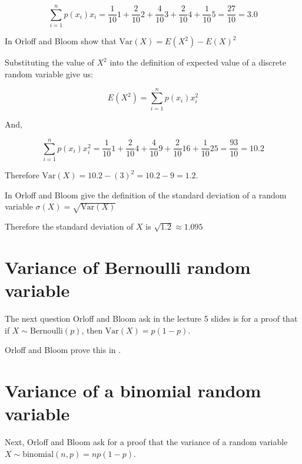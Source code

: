 \documentclass[a4paper,11pt]{article}
\begin{document}
\begin{equation}
      \sum_{i=1}^{n} p\left( x_{i} \right) x_i
  = \frac{1}{10} 1 + \frac{2}{10} 2 + \frac{4}{10} 3 + \frac{2}{10} 4 +
    \frac{1}{10} 5 = \frac{27}{10} = 3.0
\end{equation}

In \cite{reading5a} Orloff and Bloom show that
$\text{Var}\left(X \right) = E \left(X^{2}\right) - E\left( X \right)^{2}$

Substituting the value of $X^{2}$ into the definition of expected value of
a discrete random variable give us:

\begin{equation}
    E\left(X^{2} \right) =
      \sum_{i=1}^{n} p\left( x_{i} \right) x_i^{2}
\end{equation}

And,

\begin{equation}
    \sum_{i=1}^{n} p\left( x_{i} \right) x_i^{2}
    = \frac{1}{10} 1 + \frac{2}{10} 4 + \frac{4}{10} 9 + \frac{2}{10} 16 +
    \frac{1}{10} 25 = \frac{93}{10} = 10.2
\end{equation}

Therefore $\text{Var}\left( X \right) = 10.2 - \left( 3 \right)^{2}
  = 10.2 - 9 = 1.2$.

In \cite{reading5a} Orloff and Bloom give the definition of the standard
deviation of a random variable
$\sigma \left( X \right) = \sqrt{\text{Var}\left(X \right)}$

Therefore the standard deviation of $X$ is $\sqrt{1.2} \approx 1.095 $

\section{Variance of Bernoulli random variable}

The next question Orloff and Bloom ask in the lecture 5 slides is for a proof
that if $X \sim \text{Bernoulli} \left( p \right)$, then
$\text{Var}\left( X \right) = p\left( 1-p \right)$.

Orloff and Bloom prove this in \cite{reading5a}.

\section{Variance of a binomial random variable}

Next, Orloff and Bloom ask for a proof that the variance of a random variable
$X \sim \text{binomial}\left(n, p \right) = np \left( 1 - p \right)$.
\end{document}
